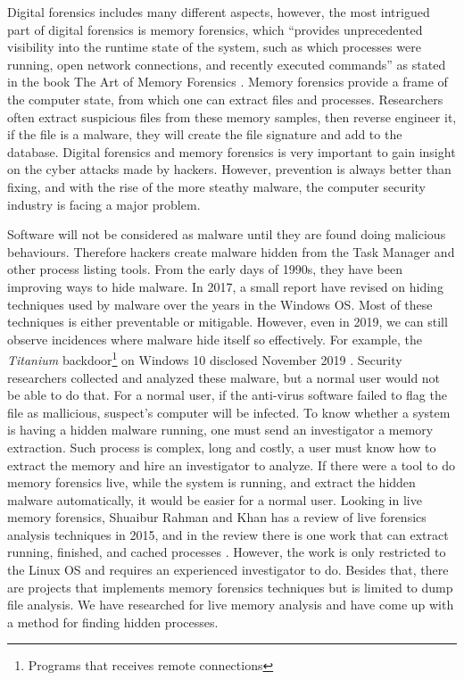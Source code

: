 Digital forensics includes many different aspects, however, the most intrigued
part of digital forensics is memory forensics, which ``provides unprecedented
visibility into the runtime state of the system, such as which processes were
running, open network connections, and recently executed commands'' as stated
in the book The Art of Memory Forensics \cite{ligh2014art}. Memory forensics
provide a frame of the computer state, from which one can extract files and
processes. Researchers often extract suspicious files from these memory
samples, then reverse engineer it, if the file is a malware, they will create
the file signature and add to the database. Digital forensics and memory
forensics is very important to gain insight on the cyber attacks made by
hackers. However, prevention is always better than fixing, and with the rise of
the more steathy malware, the computer security industry is facing a major
problem.

Software will not be considered as malware until they are found doing malicious
behaviours. Therefore hackers create malware hidden from the Task Manager and
other process listing tools. From the early days of 1990s, they have been
improving ways to hide malware. In 2017, a small report \cite{evolutionHidding}
have revised on hiding techniques used by malware over the years in the Windows
OS. Most of these techniques is either preventable or mitigable. However, even
in 2019, we can still observe incidences where malware hide itself so
effectively. For example, the \textit{Titanium} backdoor\footnote{Programs that
receives remote connections} on Windows 10 disclosed November 2019
\cite{titanium}. Security researchers collected and analyzed these malware, but
a normal user would not be able to do that. For a normal user, if the
anti-virus software failed to flag the file as mallicious, suspect's computer
will be infected. To know whether a system is having a hidden malware running,
one must send an investigator a memory extraction. Such process is complex,
long and costly, a user must know how to extract the memory and hire an
investigator to analyze. If there were a tool to do memory forensics live,
while the system is running, and extract the hidden malware automatically, it
would be easier for a normal user. Looking in live memory forensics, Shuaibur
Rahman and Khan \cite{reviewLive} has a review of live forensics analysis
techniques in 2015, and in the review there is one work that can extract
running, finished, and cached processes \cite{comparativeLive}. However, the
work is only restricted to the Linux OS and requires an experienced
investigator to do. Besides that, there are projects that implements memory
forensics techniques but is limited to dump file analysis. We have researched
for live memory analysis and have come up with a method for finding hidden
processes.

